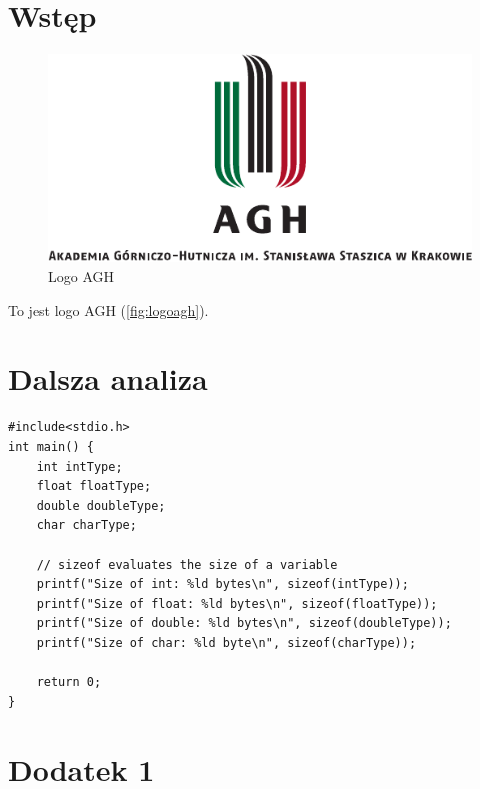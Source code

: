 \documentclass[language=polish,type=master]{aghmodern}
\author{Jan Kowalski}
\date{2020}
\begin{document}
\frontmatter
\maketitle
\tableofcontents

\mainmatter

\chapter{Wstęp}

\lipsum[1]

\begin{figure}
\includegraphics[width=\textwidth]{agh-name-color-pl.pdf}
\caption{Logo AGH}
\label{fig:logoagh}
\end{figure}

To jest logo AGH (\autoref{fig:logoagh}).

\lipsum[2-5]

\chapter{Dalsza analiza}

\lipsum\cite{nowacki1995t}

\begin{verbatim}
#include<stdio.h>
int main() {
    int intType;
    float floatType;
    double doubleType;
    char charType;

    // sizeof evaluates the size of a variable
    printf("Size of int: %ld bytes\n", sizeof(intType));
    printf("Size of float: %ld bytes\n", sizeof(floatType));
    printf("Size of double: %ld bytes\n", sizeof(doubleType));
    printf("Size of char: %ld byte\n", sizeof(charType));

    return 0;
}
\end{verbatim}

\appendix

\chapter{Dodatek 1}
\end{document}
